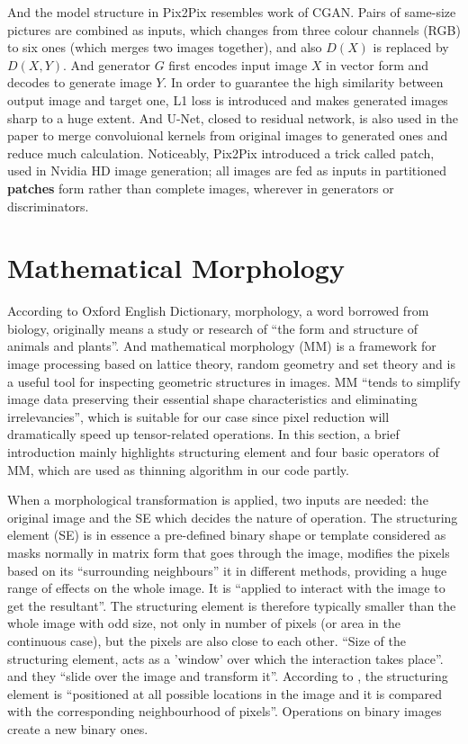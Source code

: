 And the model structure in Pix2Pix\cite{DBLP:journals/corr/IsolaZZE16} resembles work of CGAN. Pairs of same-size pictures are combined as inputs, which changes from three colour channels (RGB) to six ones (which merges two images together), and also $ D(X) $ is replaced by $ D(X, Y) $. And generator $ G $ first encodes input image $ X $ in vector form and decodes to generate image $ Y $. In order to guarantee the high similarity between output image and target one, L1 loss is introduced and makes generated images sharp to a huge extent. And U-Net, closed to residual network, is also used in the paper to merge convoluional kernels from original images to generated ones and reduce much calculation. Noticeably, Pix2Pix introduced a trick called patch, used in Nvidia HD image generation\cite{DBLP:journals/corr/abs-1711-11585}; all images are fed as inputs in partitioned \textbf{patches} form rather than complete images, wherever in generators or discriminators.

\section{Mathematical Morphology}
According to Oxford English Dictionary, morphology, a word borrowed from biology, originally means a study or research of ``the form and structure of animals and plants''. And mathematical morphology (MM) is a framework for image processing based on lattice theory, random geometry\cite{serra1983image} and set theory and is a useful tool for inspecting geometric structures in images\cite{soille2013morphological}. MM ``tends to simplify image data preserving their essential shape characteristics and eliminating irrelevancies''\cite{haralick1987image}, which is suitable for our case since pixel reduction will dramatically speed up tensor-related operations. In this section, a brief introduction mainly highlights structuring element and four basic operators of MM, which are used as thinning algorithm in our code partly.

When a morphological transformation is applied, two inputs are needed: the original image and the SE which decides the nature of operation. The structuring element (SE) is in essence a pre-defined binary shape or template considered as masks normally in matrix form that goes through the image, modifies the pixels based on its ``surrounding neighbours'' it in different methods, providing a huge range of effects on the whole image. It is ``applied to interact with the image to get the resultant''\cite{ravi2013morphological}. The structuring element is therefore typically smaller than the whole image with odd size, not only in number of pixels (or area in the continuous case), but the pixels are also close to each other. ``Size of the structuring element, acts as a 'window' over which the interaction takes place''\cite{ravi2013morphological}. and they ``slide over the image and transform it''. According to \cite{ravi2013morphological}, the structuring element is ``positioned at all possible locations in the image and it is compared with the corresponding neighbourhood of pixels''. Operations on binary images create a new binary ones.

